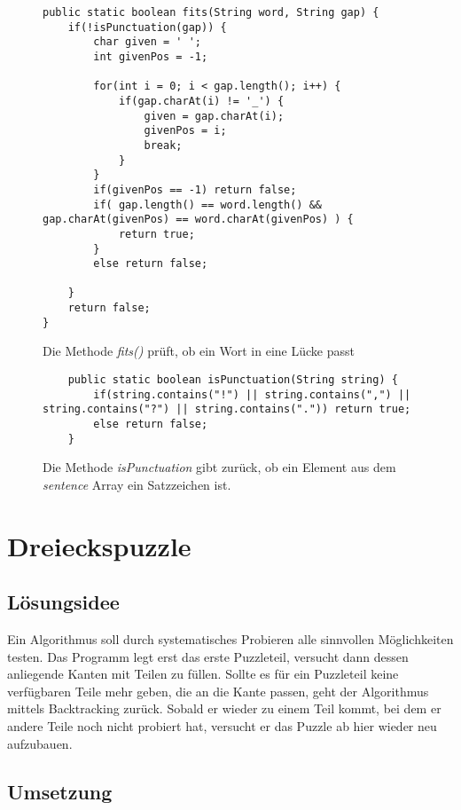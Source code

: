 \documentclass[a4paper, 12pt]{scrartcl}
\begin{document}
\begin{figure}[H]
    \centering
\begin{lstlisting}
public static boolean fits(String word, String gap) {
    if(!isPunctuation(gap)) {
        char given = ' ';
        int givenPos = -1;
        
        for(int i = 0; i < gap.length(); i++) {
            if(gap.charAt(i) != '_') {
                given = gap.charAt(i);
                givenPos = i;
                break;
            }
        }
        if(givenPos == -1) return false;
        if( gap.length() == word.length() && gap.charAt(givenPos) == word.charAt(givenPos) ) {
            return true;
        }
        else return false;
        
    }
    return false;
}
\end{lstlisting}
    \caption{Die Methode \emph{fits()} prüft, ob ein Wort in eine Lücke passt}
\end{figure}

\begin{figure}[H]
    \centering
\begin{lstlisting}
    public static boolean isPunctuation(String string) {
    	if(string.contains("!") || string.contains(",") || string.contains("?") || string.contains(".")) return true;
    	else return false;
    }
\end{lstlisting}
\caption{Die Methode \emph{isPunctuation} gibt zurück, ob ein Element aus dem \emph{sentence} Array ein Satzzeichen ist.}
\end{figure}

\section{Dreieckspuzzle}
\subsection{Lösungsidee}

Ein Algorithmus soll durch systematisches Probieren alle sinnvollen Möglichkeiten testen. Das Programm legt erst das erste Puzzleteil, versucht dann dessen anliegende Kanten mit Teilen zu füllen. Sollte es für ein Puzzleteil keine verfügbaren Teile mehr geben, die an die Kante passen, geht der Algorithmus mittels Backtracking zurück. Sobald er wieder zu einem Teil kommt, bei dem er andere Teile noch nicht probiert hat, versucht er das Puzzle ab hier wieder neu aufzubauen.

\subsection{Umsetzung}
\end{document}
